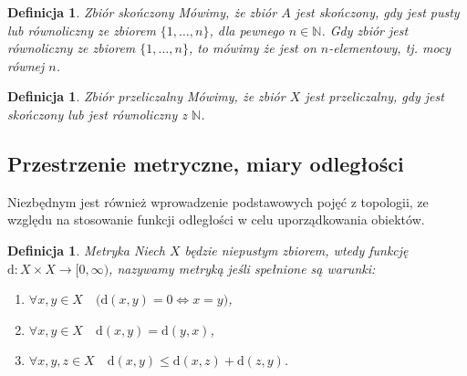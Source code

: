 \documentclass[12pt,a4paper]{report}
\newtheorem{definition}[theorem]{Definicja}
\newcommand{\licznosc}[1]{\overline{\overline{#1}}}
\begin{document}
\begin{definition}{Zbiór skończony \cite[Rozdział 5]{blaszczyk2007}}
Mówimy, że zbiór $A$ jest skończony, gdy jest pusty lub równoliczny ze zbiorem $\{1, \ldots, n \}$, dla pewnego $n \in \mathbb{N}$. Gdy zbiór jest równoliczny ze zbiorem $\{1, \ldots, n\}$, to mówimy że jest on $n$-elementowy, tj. mocy równej $n$.
\end{definition}


\begin{definition}{Zbiór przeliczalny \cite[Rozdział 5]{blaszczyk2007}}
Mówimy, że zbiór $X$ jest przeliczalny, gdy jest skończony lub jest równoliczny z $\mathbb{N}$.
\end{definition}






\subsection{Przestrzenie metryczne, miary odległości}


Niezbędnym jest również wprowadzenie podstawowych pojęć z topologii, ze względu na stosowanie funkcji odległości w celu uporządkowania obiektów.


\begin{definition}{Metryka \cite[Rozdzial 9]{kuratowski2004}}
Niech $X$ będzie niepustym zbiorem, wtedy funkcję $\mathrm{d}: X \times X \rightarrow [0,\infty)$, nazywamy metryką jeśli spełnione są warunki:
\begin{enumerate}
\item $\forall x, y \in X \quad \big(\mathrm{d}(x,y) = 0  \Longleftrightarrow x=y \big)$,
\item $\forall x, y \in X \quad \mathrm{d}(x,y)=\mathrm{d}(y,x)$,
\item $\forall  x, y, z \in X \quad \mathrm{d}(x,y)\leq \mathrm{d}(x,z)+\mathrm{d}(z,y)$.
\end{enumerate}
\end{definition}
\end{document}
